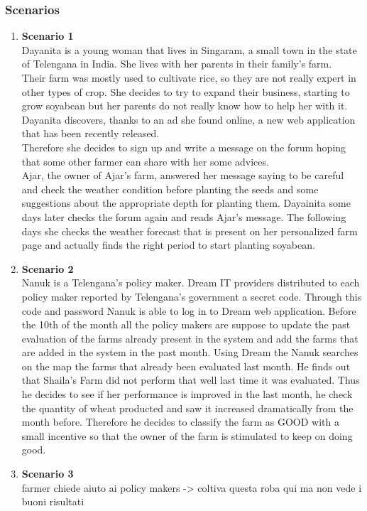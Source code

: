 \subsubsection{Scenarios}
\begin{enumerate}
    \item \textbf{Scenario 1}\\
    Dayanita is a young woman that lives in Singaram, a small town in the state of Telengana in India. 
    She lives with her parents in their family's farm. \\
    Their farm was mostly used to cultivate rice, so they are not really expert in other types of crop. She decides to try to expand their business, starting to grow 
    soyabean but her parents do not really know how to help her with it. \\
    Dayanita discovers, thanks to an ad she found online, a new web application that has been recently released. \\
    Therefore she decides to sign up and write a message on the forum hoping that some other farmer can share with her some advices.\\
    Ajar, the owner of Ajar's farm, answered her message saying to be careful and check the weather condition before planting the seeds and some suggestions 
    about the appropriate depth for planting them. 
    Dayainita some days later checks the forum again and reads Ajar's message. 
    The following days she checks the weather forecast that is present on her personalized farm page and actually 
    finds the right period to start planting soyabean.



    \item \textbf{Scenario 2}\\
    Nanuk is a Telengana’s policy maker. Dream IT providers distributed to each policy maker reported by Telengana's government a secret code. Through this code 
    and password Nanuk is able to log in to Dream web application. 
    Before the 10th of the month all the policy makers are suppose to update the past evaluation of the farms already present in 
    the system and add the farms that are added in the system in the past month.
    Using Dream the Nanuk searches on the map the farms that already been evaluated last month. He finds out that Shaila's Farm did 
    not perform that well last time it was evaluated.
    Thus he decides to see if her performance is improved in the last month, he check the quantity of wheat producted and 
    saw it increased dramatically from the month before.
    Therefore he decides to classify the farm as GOOD with a small incentive so that the owner of the farm is stimulated to keep on doing good.
    
    
    \item \textbf{Scenario 3}\\
    farmer chiede aiuto ai policy makers -> coltiva questa roba qui ma non vede i buoni risultati
    
    
\end{enumerate}


